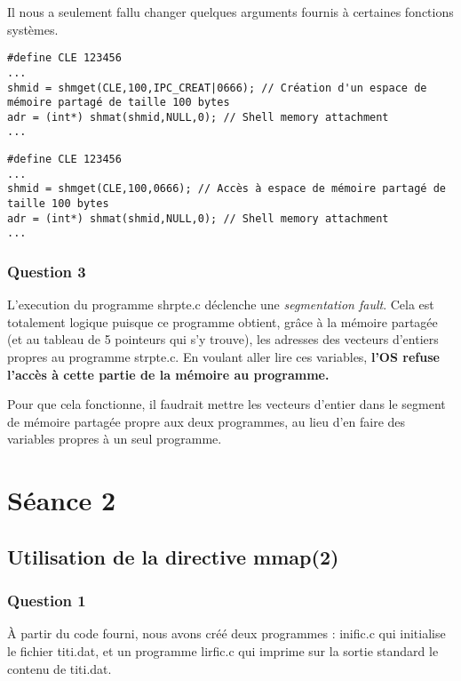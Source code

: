 \medskip

Il nous a seulement fallu changer quelques arguments fournis à certaines fonctions systèmes.

\begin{lstlisting}
#define CLE 123456
...
shmid = shmget(CLE,100,IPC_CREAT|0666); // Création d'un espace de mémoire partagé de taille 100 bytes
adr = (int*) shmat(shmid,NULL,0); // Shell memory attachment
...
\end{lstlisting}

\begin{lstlisting}
#define CLE 123456
...
shmid = shmget(CLE,100,0666); // Accès à espace de mémoire partagé de taille 100 bytes
adr = (int*) shmat(shmid,NULL,0); // Shell memory attachment
...
\end{lstlisting}

\section{Question 3}

L'execution du programme shrpte.c déclenche une \textit{segmentation fault}. Cela est totalement logique puisque ce programme obtient, grâce à la mémoire partagée (et au tableau de 5 pointeurs qui s'y trouve), les adresses des vecteurs d'entiers propres au programme strpte.c. En voulant aller lire ces variables, \textbf{l'OS refuse l'accès à cette partie de la mémoire au programme.}

\medskip

Pour que cela fonctionne, il faudrait mettre les vecteurs d'entier dans le segment de mémoire partagée propre aux deux programmes, au lieu d'en faire des variables propres à un seul programme.

\part{Séance 2}

\chapter{Utilisation de la directive mmap(2)}

\section{Question 1}

À partir du code fourni, nous avons créé deux programmes : inific.c qui initialise le fichier \og{}titi.dat\fg{}, et un programme lirfic.c qui imprime sur la sortie standard le contenu de \og{}titi.dat\fg{}.

